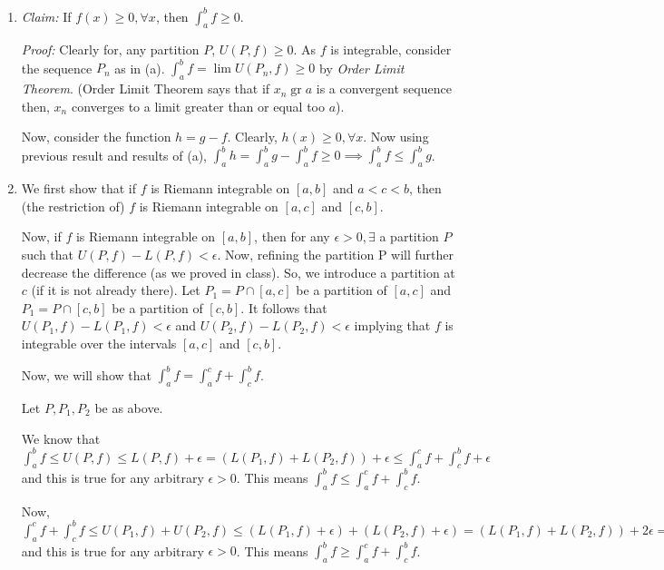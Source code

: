 \documentclass[11pt]{amsart}
\newcommand{\gr}{\operatorname{gr}}
\theoremstyle{definition}
\begin{document}
\begin{enumerate}[wide, labelwidth=!, labelindent=0pt]
\begin{enumerate}[label=(\alph*)]
$f g = \frac{1}{2} ((f + g)^2 - f^2 - g^2)$. We showed, $f+g$ is integrable, meaning $(f+g)^2$ is integrable and $f^2$ and $g^2$ are integrable. Now, using the fact that sum of integrable function are integrable, $f g$ is also Riemann integrable.

\item 

\textit{Claim:} If $f(x) \ge 0, \forall x$, then $\int_a^b f \ge 0$.

\textit{Proof:} Clearly for, any partition $P$, $U(P,f) \ge 0$. As $f$ is integrable, consider the sequence $P_n$ as in (a). $\int_a^b f = \lim U(P_n,f) \ge 0$ by \textit{Order Limit Theorem}. (Order Limit Theorem says that if $x_n \gr a$ is a convergent sequence then, $x_n$ converges to a limit greater than or equal too $a$).

Now, consider the function $h = g - f$. Clearly, $h(x) \ge 0, \forall x$. Now using previous result and results of (a), $\int_a^b h = \int_a^b g - \int_a^b f \ge 0 \implies \int_a^b f \le \int_a^b g$.

\item

We first show that if $f$ is Riemann integrable on $[a,b]$ and $a < c <b$, then (the restriction of) $f$ is Riemann integrable on $[a,c]$ and $[c,b]$.

Now, if $f$ is Riemann integrable on $[a,b]$, then for any $\epsilon > 0, \exists$ a partition $P$ such that $U(P,f) - L(P,f) < \epsilon$. Now, refining the partition P will further decrease the difference (as we proved in class). So, we introduce a partition at $c$ (if it is not already there). Let $P_1 = P \cap [a,c]$ be a partition of $[a,c]$ and $P_1 = P \cap [c,b]$ be a partition of $[c,b]$. It follows that $U(P_1,f) - L(P_1,f) < \epsilon$ and $U(P_2,f) - L(P_2,f) < \epsilon$ implying that $f$ is integrable over the intervals $[a,c]$ and $[c,b]$.

Now, we will show that $\int_a^b f = \int_a^c f + \int_c^b f$.

Let $P , P_1, P_2$ be as above. 

We know that $\int_a^b f \le U(P,f) \le L(P,f) + \epsilon = (L(P_1,f) + L(P_2,f)) + \epsilon \le \int_a^c f + \int_c^b f + \epsilon$ and this is true for any arbitrary $\epsilon > 0$. This means $\int_a^b f \le \int_a^c f + \int_c^b f$.

Now, $\int_a^c f + \int_c^b f \le U(P_1,f) + U(P_2,f) \le (L(P_1,f) + \epsilon) + (L(P_2,f) + \epsilon) = (L(P_1,f) + L(P_2,f)) + 2\epsilon = L(P,f) + 2\epsilon \le \int_a^b f + 2\epsilon$ and this is true for any arbitrary $\epsilon > 0$. This means $\int_a^b f \ge \int_a^c f + \int_c^b f$.


\end{enumerate}
\end{enumerate}
\end{document}
